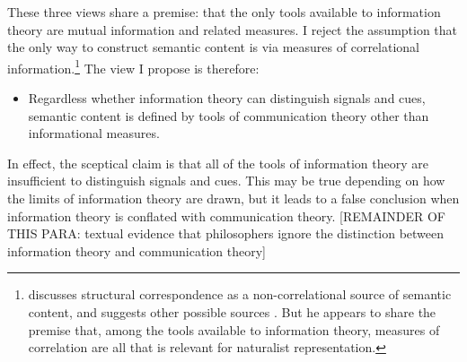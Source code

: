 \noindent These three views share a premise: that the only tools available to information theory are mutual information and related measures.
I reject the assumption that the only way to construct semantic content is via measures of correlational information.\footnote{\citet[$\S$5]{shea2018representation} discusses structural correspondence as a non-correlational source of semantic content, and suggests other possible sources \citep[p. 76 n. 1]{shea2018representation}. But he appears to share the premise that, among the tools available to information theory, measures of correlation are all that is relevant for naturalist representation.}
The view I propose is therefore:

\begin{itemize}
    \item Regardless whether information theory can distinguish signals and cues, semantic content is defined by tools of communication theory other than informational measures.
\end{itemize}

\noindent 
In effect, the sceptical claim is that all of the tools of information theory are insufficient to distinguish signals and cues.
This may be true depending on how the limits of information theory are drawn, but it leads to a false conclusion when information theory is conflated with communication theory.
[REMAINDER OF THIS PARA: textual evidence that philosophers ignore the distinction between information theory and communication theory]




